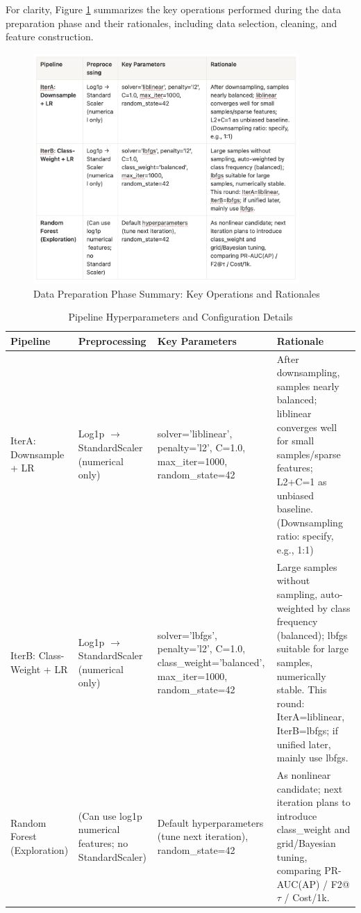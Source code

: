 \documentclass[sigplan,screen]{acmart}
\begin{document}
For clarity, Figure \ref{fig:data_preparation_summary} summarizes the key operations performed during the data preparation phase and their rationales, including data selection, cleaning, and feature construction.

\begin{figure}[h!]
    \centering
    \includegraphics[width=0.9\textwidth]{6.3.1.jpg}
    \caption{Data Preparation Phase Summary: Key Operations and Rationales}
    \label{fig:data_preparation_summary}
\end{figure}

\begin{table}[h!]
    \centering
    \small
    \renewcommand{\arraystretch}{1.3}
    \begin{tabular}{|p{3.0cm}|p{3.5cm}|p{4.0cm}|p{6.5cm}|}
    \hline
    \textbf{Pipeline} & \textbf{Preprocessing} & \textbf{Key Parameters} & \textbf{Rationale} \\
    \hline
    IterA: Downsample + LR & Log1p $\rightarrow$ StandardScaler (numerical only) & solver='liblinear', penalty='l2', C=1.0, max\_iter=1000, random\_state=42 & After downsampling, samples nearly balanced; liblinear converges well for small samples/sparse features; L2+C=1 as unbiased baseline. (Downsampling ratio: specify, e.g., 1:1) \\[3pt]
    \hline
    IterB: Class-Weight + LR & Log1p $\rightarrow$ StandardScaler (numerical only) & solver='lbfgs', penalty='l2', C=1.0, class\_weight='balanced', max\_iter=1000, random\_state=42 & Large samples without sampling, auto-weighted by class frequency (balanced); lbfgs suitable for large samples, numerically stable. This round: IterA=liblinear, IterB=lbfgs; if unified later, mainly use lbfgs. \\[3pt]
    \hline
    Random Forest (Exploration) & (Can use log1p numerical features; no StandardScaler) & Default hyperparameters (tune next iteration), random\_state=42 & As nonlinear candidate; next iteration plans to introduce class\_weight and grid/Bayesian tuning, comparing PR-AUC(AP) / F2@$\tau$ / Cost/1k. \\[3pt]
    \hline
    \end{tabular}
    \caption{Pipeline Hyperparameters and Configuration Details}
    \label{tab:pipeline_hyperparameters}
\end{table}
\end{document}
